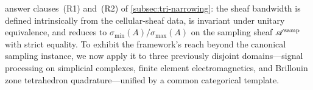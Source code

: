  answer
clauses~\textup{(R1)} and~\textup{(R2)} of
\cref{subsec:tri-narrowing}: the sheaf bandwidth is defined
intrinsically from the cellular-sheaf data, is invariant under
unitary equivalence, and reduces to $\sigma_{\min}(A)/\sigma_{\max}(A)$
on the sampling sheaf $\mathscr{A}^{\mathrm{samp}}$ with strict equality. To exhibit
the framework's reach beyond the canonical sampling instance, we now
apply it to three previously disjoint domains---signal processing on
simplicial complexes, finite element electromagnetics, and Brillouin
zone tetrahedron quadrature---unified by a common categorical template.
